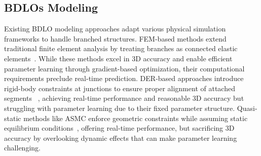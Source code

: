 
\subsection{BDLOs Modeling}
Existing BDLO modeling approaches adapt various physical simulation frameworks to handle branched structures.
FEM-based methods extend traditional finite element analysis by treating branches as connected elastic elements~\cite{BDLO_FEM}. 
While these methods excel in 3D accuracy and enable efficient parameter learning through gradient-based optimization, their computational requirements preclude real-time prediction. 
DER-based approaches introduce rigid-body constraints at junctions to ensure proper alignment of attached segments ~\cite{originalDER}, achieving real-time performance and reasonable 3D accuracy but struggling with parameter learning due to their fixed parameter structure. 
Quasi-static methods like ASMC enforce geometric constraints while assuming static equilibrium conditions~\cite{baseline1}, offering real-time performance, but sacrificing 3D accuracy by overlooking dynamic effects that can make parameter learning challenging.



